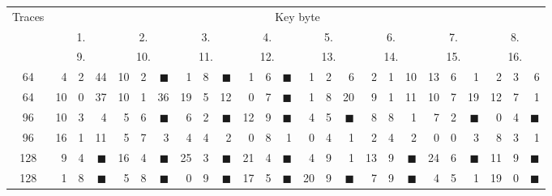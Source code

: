 \begin{tabular}{| c | r@{.} l@{\quad}r | r@{.} l@{\quad}r | r@{.} l@{\quad}r | r@{.} l@{\quad}r | r@{.} l@{\quad}r | r@{.} l@{\quad}r | r@{.} l@{\quad}r | r@{.} l@{\quad}r |}
	\hline
	\multirow{3}{*}{Traces} & \multicolumn{24}{c|}{Key byte} \\
	\cline{2-25}
	~  &  \multicolumn{3}{c|}{1.} &  \multicolumn{3}{c|}{2.} &  \multicolumn{3}{c|}{3.} &  \multicolumn{3}{c|}{4.} &  \multicolumn{3}{c|}{5.} &  \multicolumn{3}{c|}{6.} &  \multicolumn{3}{c|}{7.} &  \multicolumn{3}{c|}{8.} \\
	\cline{2-25}
	~  &  \multicolumn{3}{c|}{9.} & \multicolumn{3}{c|}{10.} & \multicolumn{3}{c|}{11.} & \multicolumn{3}{c|}{12.} & \multicolumn{3}{c|}{13.} & \multicolumn{3}{c|}{14.} & \multicolumn{3}{c|}{15.} & \multicolumn{3}{c|}{16.} \\
	\hline
	\hline
	64&4&2&44&10&2&{$\blacksquare$}&1&8&{\weak$\blacksquare$}&1&6&{\weak$\blacksquare$}&1&2&6&2&1&10&13&6&1&2&3&6 \\
	\hline
	64&10&0&37&10&1&36&19&5&12&0&7&{\weak$\blacksquare$}&1&8&20&9&1&11&10&7&19&12&7&1 \\
	\hline
	\hline
	96&10&3&4&5&6&{\weak$\blacksquare$}&6&2&{\weak$\blacksquare$}&12&9&{$\blacksquare$}&4&5&{\weak$\blacksquare$}&8&8&1&7&2&{\weak$\blacksquare$}&0&4&{\weak$\blacksquare$} \\
	\hline
	96&16&1&11&5&7&3&4&4&2&0&8&1&0&4&1&2&4&2&0&0&3&8&3&1 \\
	\hline
	\hline
	128&9&4&{\weak$\blacksquare$}&16&4&{$\blacksquare$}&25&3&{$\blacksquare$}&21&4&{$\blacksquare$}&4&9&1&13&9&{$\blacksquare$}&24&6&{$\blacksquare$}&11&9&{$\blacksquare$} \\
	\hline
	128&1&8&{\weak$\blacksquare$}&5&8&{\weak$\blacksquare$}&0&9&{\weak$\blacksquare$}&17&5&{$\blacksquare$}&20&9&{$\blacksquare$}&7&9&{\weak$\blacksquare$}&4&5&1&19&0&{$\blacksquare$}	 \\
	\hline
\end{tabular}
